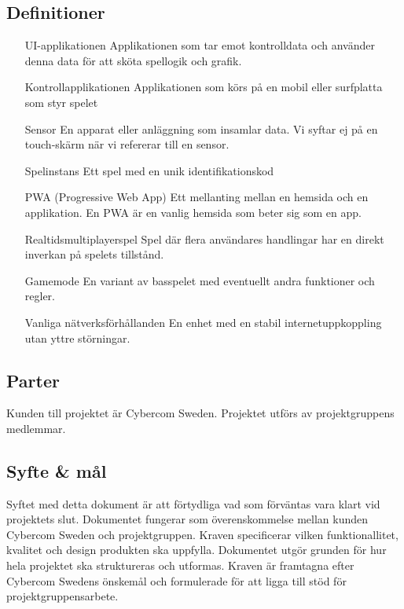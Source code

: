 \documentclass[10pt]{article}
\begin{document}
	\subsection{Definitioner}
		\begin{itemize}[leftmargin=5cm]
		\item [UI-applikationen] Applikationen som tar emot kontrolldata och använder denna data för att sköta spellogik och grafik.
		\item [Kontrollapplikationen] Applikationen som körs på en mobil eller surfplatta som styr spelet
		\item [Sensor] En apparat eller anläggning som insamlar data. Vi syftar ej på en touch-skärm när vi refererar till en sensor.
		\item [Spelinstans] Ett spel med en unik identifikationskod
		\item [PWA (Progressive Web App)] Ett mellanting mellan en hemsida och en applikation. En PWA är en vanlig hemsida som beter sig som en app.
		\item [Realtidsmultiplayerspel] Spel där flera användares handlingar har en direkt inverkan på spelets tillstånd.
		\item [Gamemode] En variant av basspelet med eventuellt andra funktioner och regler.
		\item [Vanliga nätverksförhållanden] En enhet med en stabil internetuppkoppling utan yttre störningar.
		\end{itemize}	

	\subsection{Parter}
	Kunden till projektet är Cybercom Sweden. Projektet utförs av projektgruppens medlemmar.
	
	\subsection{Syfte \& mål}
	Syftet med detta dokument är att förtydliga vad som förväntas vara klart vid projektets slut. Dokumentet fungerar som överenskommelse mellan kunden Cybercom Sweden och projektgruppen. Kraven specificerar vilken funktionallitet, kvalitet och design produkten ska uppfylla. Dokumentet utgör grunden för hur hela projektet ska struktureras och utformas. Kraven är framtagna efter Cybercom Swedens önskemål och formulerade för att ligga till stöd för projektgruppensarbete.
	
\end{document}
